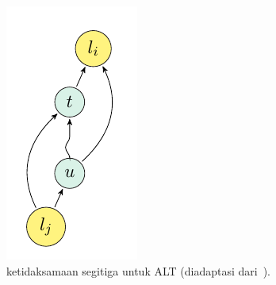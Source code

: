 \begin{figure}[H]
    \centering
    \includegraphics[]{figures/ALT.png}
    \caption{ketidaksamaan segitiga untuk ALT (diadaptasi dari~\cite{Bast2015}).}
    \label{fig:alt-triangle-ineq}
\end{figure}

